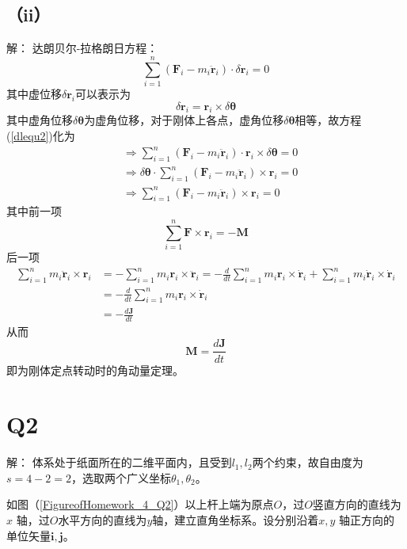 \documentclass[10pt,a4paper]{article}
\begin{document}
\subsection*{（ii）}解：
达朗贝尔-拉格朗日方程：
\begin{equation}
\label{dlequ2}
\sum_{i=1}^n(\bm{F}_i-m_i\ddot{\bm{r}}_i)\cdot\delta\bm{r}_i = 0
\end{equation}
其中虚位移$\delta\bm{r}_i$可以表示为
\[
\delta\bm{r}_i = \bm{r}_i\times\delta\bm{\theta}
\]
其中虚角位移$\delta\bm{\theta}$为虚角位移，对于刚体上各点，虚角位移$\delta\bm{\theta}$相等，故方程(\ref{dlequ2})化为
\begin{align*}
&\Longrightarrow\sum_{i=1}^n(\bm{F}_i-m_i\ddot{\bm{r}}_i)\cdot\bm{r}_i\times\delta\bm{\theta} = 0\\
&\Longrightarrow\delta\bm{\theta}\cdot\sum_{i=1}^n(\bm{F}_i-m_i\ddot{\bm{r}}_i)\times\bm{r}_i = 0\\
&\Longrightarrow\sum_{i=1}^n(\bm{F}_i-m_i\ddot{\bm{r}}_i)\times\bm{r}_i = 0
\end{align*}
其中前一项
\[
\sum_{i=1}^n\bm{F}\times\bm{r}_i = -\bm{M}
\]
后一项
\begin{align*}
\sum_{i=1}^nm_i\ddot{\bm{r}}_i\times\bm{r}_i &= -\sum_{i=1}^nm_i\bm{r}_i\times\ddot{\bm{r}}_i = -\frac{d}{dt}\sum_{i=1}^nm_i\bm{r}_i\times\dot{\bm{r}}_i+\sum_{i=1}^nm_i\dot{\bm{r}}_i\times\dot{\bm{r}}_i\\
&= -\frac{d}{dt}\sum_{i=1}^nm_i\bm{r}_i\times\dot{\bm{r}}_i\\
&= -\frac{d\bm{J}}{dt}
\end{align*}
从而
\[
\bm{M} = \frac{d\bm{J}}{dt}
\]
即为刚体定点转动时的角动量定理。
\section*{Q2}解：
体系处于纸面所在的二维平面内，且受到$l_1,l_2$两个约束，故自由度为$s=4-2=2$，选取两个广义坐标$\theta_1,\theta_2$。

\noindent 如图（\ref{FigureofHomework_4_Q2}）以上杆上端为原点$O$，过$O$竖直方向的直线为$x$ 轴，过$O$水平方向的直线为$y$轴，建立直角坐标系。设分别沿着$x,y$ 轴正方向的单位矢量$\bm{i},\bm{j}$。
\end{document}
